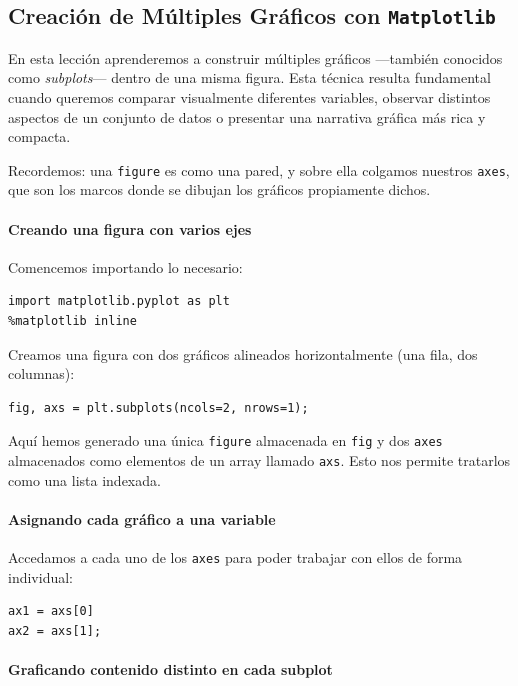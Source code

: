 \documentclass{article}
\theoremstyle{nonumberplain}
\begin{document}
\subsection*{Creación de Múltiples Gráficos con \texttt{Matplotlib}}

En esta lección aprenderemos a construir múltiples gráficos —también conocidos como \textit{subplots}— dentro de una misma figura. Esta técnica resulta fundamental cuando queremos comparar visualmente diferentes variables, observar distintos aspectos de un conjunto de datos o presentar una narrativa gráfica más rica y compacta.

Recordemos: una \texttt{figure} es como una pared, y sobre ella colgamos nuestros \texttt{axes}, que son los marcos donde se dibujan los gráficos propiamente dichos.

\paragraph{Creando una figura con varios ejes}

Comencemos importando lo necesario:

\begin{verbatim}
import matplotlib.pyplot as plt
%matplotlib inline
\end{verbatim}

Creamos una figura con dos gráficos alineados horizontalmente (una fila, dos columnas):

\begin{verbatim}
fig, axs = plt.subplots(ncols=2, nrows=1);
\end{verbatim}

Aquí hemos generado una única \texttt{figure} almacenada en \texttt{fig} y dos \texttt{axes} almacenados como elementos de un array llamado \texttt{axs}. Esto nos permite tratarlos como una lista indexada.

\paragraph{Asignando cada gráfico a una variable}

Accedamos a cada uno de los \texttt{axes} para poder trabajar con ellos de forma individual:

\begin{verbatim}
ax1 = axs[0]
ax2 = axs[1];
\end{verbatim}

\paragraph{Graficando contenido distinto en cada subplot}
\end{document}
